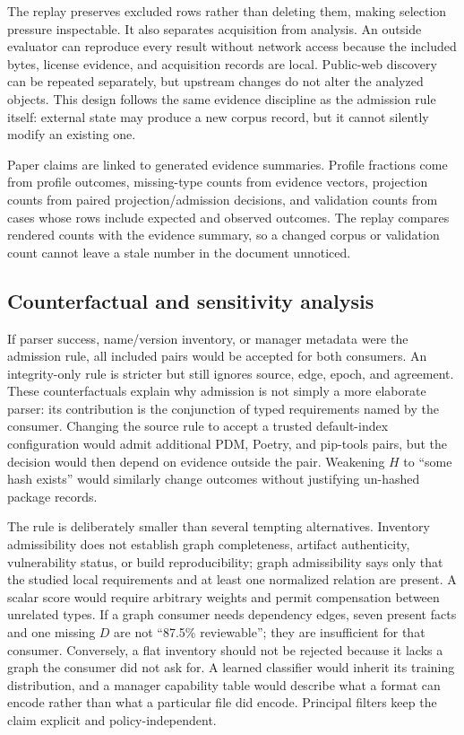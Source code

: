 \documentclass[10pt,conference]{IEEEtran}
\begin{document}
The replay preserves excluded rows rather than deleting them, making selection pressure inspectable. It also separates acquisition from analysis. An outside evaluator can reproduce every result without network access because the included bytes, license evidence, and acquisition records are local. Public-web discovery can be repeated separately, but upstream changes do not alter the analyzed objects. This design follows the same evidence discipline as the admission rule itself: external state may produce a new corpus record, but it cannot silently modify an existing one.

Paper claims are linked to generated evidence summaries. Profile fractions come from profile outcomes, missing-type counts from evidence vectors, projection counts from paired projection/admission decisions, and validation counts from cases whose rows include expected and observed outcomes. The replay compares rendered counts with the evidence summary, so a changed corpus or validation count cannot leave a stale number in the document unnoticed.

\subsection{Counterfactual and sensitivity analysis}
If parser success, name/version inventory, or manager metadata were the admission rule, all included pairs would be accepted for both consumers. An integrity-only rule is stricter but still ignores source, edge, epoch, and agreement. These counterfactuals explain why admission is not simply a more elaborate parser: its contribution is the conjunction of typed requirements named by the consumer. Changing the source rule to accept a trusted default-index configuration would admit additional PDM, Poetry, and pip-tools pairs, but the decision would then depend on evidence outside the pair. Weakening $H$ to ``some hash exists'' would similarly change outcomes without justifying un-hashed package records.

The rule is deliberately smaller than several tempting alternatives. Inventory admissibility does not establish graph completeness, artifact authenticity, vulnerability status, or build reproducibility; graph admissibility says only that the studied local requirements and at least one normalized relation are present. A scalar score would require arbitrary weights and permit compensation between unrelated types. If a graph consumer needs dependency edges, seven present facts and one missing $D$ are not ``87.5\% reviewable''; they are insufficient for that consumer. Conversely, a flat inventory should not be rejected because it lacks a graph the consumer did not ask for. A learned classifier would inherit its training distribution, and a manager capability table would describe what a format can encode rather than what a particular file did encode. Principal filters keep the claim explicit and policy-independent.
\end{document}
